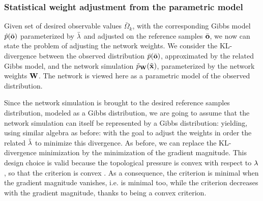 \subsubsection*{Statistical weight adjustment from the parametric model}

Given set of desired observable values $\bar{\Omega}_k$, with the corresponding Gibbs model $\hat{p}(\bar{\bf o})$ parameterized by $\bar{\bf \lambda}$ and adjusted on the reference samples $\bar{\bf o}$, we now can state the problem of adjusting the network weights. We consider the KL-divergence between the observed distribution $\bar{p}(\bar{\bf o})$, approximated by the related Gibbs model, and the network simulation $\tilde{p}_{\bf W}(\tilde{\bf x})$, parameterized by the network weights ${\bf W}$. The network is viewed here as a parametric model of the observed distribution. 

Since the network simulation is brought to the desired reference samples distribution, modeled as a Gibbs distribution, we are going to assume that the network simulation can itself be represented by a Gibbs distribution:
yielding, using similar algebra as before:
with the goal to adjust the weights in order the related $\tilde{\bf \lambda}$ to minimize this divergence. As before, we can replace the KL-divergence minimization by the minimization of the gradient magnitude. This design choice is valid because the topological pressure is convex with respect to ${\bf \lambda}$, so that the criterion is convex \cite{vasquez:inria-00574954}. As a consequence, the criterion is minimal when the gradient magnitude vanishes, i.e. is minimal too, while the criterion decreases with the gradient magnitude, thanks to being a convex criterion.

